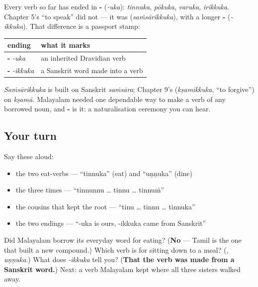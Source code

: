 \begin{grammarlens}[title={Grammar Lens: -\ml{ഉക} and -\ml{ഇക്കുക}, two doors into the verb}]
Every verb so far has ended in \textbf{-} (\emph{-uka}): \emph{tinnuka}, \emph{pōkuka}, \emph{varuka}, \emph{irikkuka}. Chapter 5's \textquotedblleft{}to speak\textquotedblright{} did not — it was \textbf{} (\emph{saṁsārikkuka}), with a longer \textbf{-} (\emph{-ikkuka}). That difference is a passport stamp:

\noindent
\begin{tabularx}{\linewidth}{@{}>{\raggedright\arraybackslash}X>{\raggedright\arraybackslash}X@{}}
\toprule
\textbf{ending} & \textbf{what it marks} \\
\midrule
\textbf{-\ml{ഉക}} \emph{-uka} & an inherited Dravidian verb \\
\textbf{-\ml{ഇക്കുക}} \emph{-ikkuka} & a Sanskrit word made into a verb \\
\bottomrule
\end{tabularx}

\emph{Saṁsārikkuka} is built on Sanskrit \emph{saṁsāra}; Chapter 9's \textbf{} (\emph{kṣamikkuka}, \textquotedblleft{}to forgive\textquotedblright{}) on \emph{kṣamā}. Malayalam needed one dependable way to make a verb of any borrowed noun, and \textbf{-} is it: a naturalisation ceremony you can hear.
\end{grammarlens}

\subsection*{Your turn}
Say these aloud:

\begin{itemize}
\raggedright
  \item the two eat-verbs — \textquotedblleft{}tinnuka\textquotedblright{} (eat) and \textquotedblleft{}uṇṇuka\textquotedblright{} (dine)
  \item the three times — \textquotedblleft{}tinnunnu … tinnu … tinnuṁ\textquotedblright{}
  \item the cousins that kept the root — \textquotedblleft{}tinu … tinnu … tinnuka\textquotedblright{}
  \item the two endings — \textquotedblleft{}-uka is ours, -ikkuka came from Sanskrit\textquotedblright{}
\end{itemize}

\begin{tcolorbox}[breakable,colback=teal!4,colframe=teal!35!black,title={Before you move on}]
Did Malayalam borrow its everyday word for eating? (\textbf{No} — Tamil is the one that built a new compound.) Which verb is for sitting down to a meal? (\textbf{}, \emph{uṇṇuka}.) What does \emph{-ikkuka} tell you? (\textbf{That the verb was made from a Sanskrit word.}) Next: a verb Malayalam kept where all three sisters walked away.
\end{tcolorbox}
